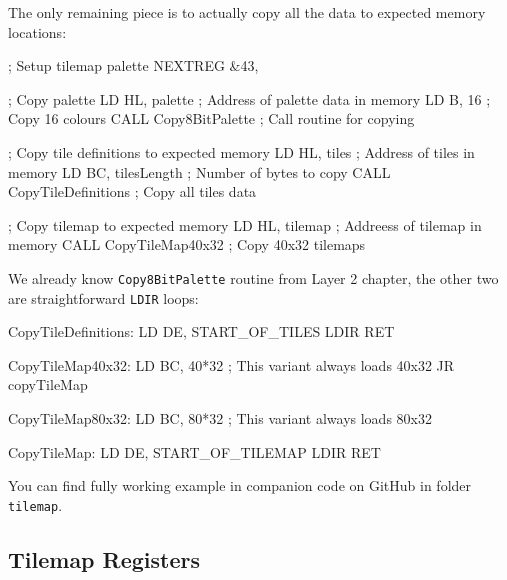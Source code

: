\pagebreak
The only remaining piece is to actually copy all the data to expected memory locations:

\begin{tcblisting}{}
	; Setup tilemap palette
	NEXTREG &43, %

	; Copy palette
	LD HL, palette               ; Address of palette data in memory
	LD B, 16                     ; Copy 16 colours
	CALL Copy8BitPalette         ; Call routine for copying

	; Copy tile definitions to expected memory
	LD HL, tiles                 ; Address of tiles in memory
	LD BC, tilesLength           ; Number of bytes to copy
	CALL CopyTileDefinitions     ; Copy all tiles data

	; Copy tilemap to expected memory
	LD HL, tilemap               ; Addreess of tilemap in memory
	CALL CopyTileMap40x32        ; Copy 40x32 tilemaps
\end{tcblisting}

We already know {\tt Copy8BitPalette} routine from Layer 2 chapter, the other two are straightforward {\tt LDIR} loops:

\begin{tcblisting}{}
CopyTileDefinitions:
	LD DE, START_OF_TILES
	LDIR
	RET

CopyTileMap40x32:
	LD BC, 40*32		; This variant always loads 40x32
	JR copyTileMap

CopyTileMap80x32:
	LD BC, 80*32		; This variant always loads 80x32

CopyTileMap:
	LD DE, START_OF_TILEMAP
	LDIR
	RET
\end{tcblisting}

You can find fully working example in companion code on GitHub in folder {\tt tilemap}.


\pagebreak
\subsection{Tilemap Registers}
\label{zx_next_tilemap_registers}

\subsubsection{}

